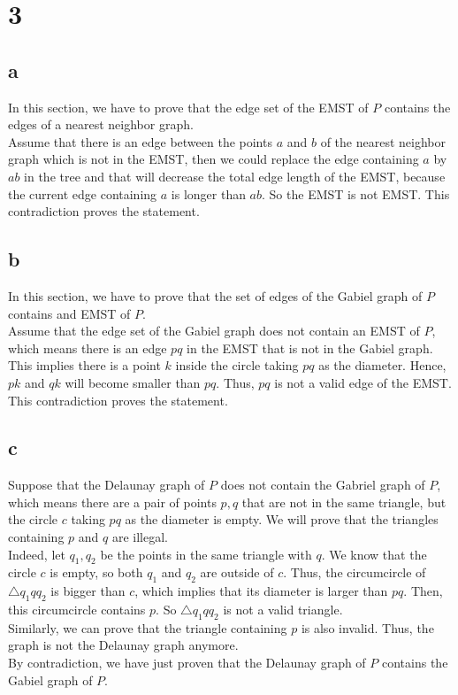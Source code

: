 \section*{3}
\subsection*{a}
In this section, we have to prove that the edge set of the EMST of $P$ contains the edges of a nearest neighbor graph.\\

Assume that there is an edge between the points $ a $ and $ b $ of the nearest neighbor graph which is not in the EMST, then we could replace the edge containing $a$ by $ab$ in the tree and that will decrease the total edge length of the EMST, because the current edge containing $a$ is longer than $ab$. So the EMST is not EMST. This contradiction proves the statement.

\subsection*{b}
In this section, we have to prove that the set of edges of the Gabiel graph of $P$ contains and EMST of $P$. \\

Assume that the edge set of the Gabiel graph does not contain an EMST of $P$, which means there is an edge $pq$ in the EMST that is not in the Gabiel graph. \\

This implies there is a point $k$ inside the circle taking $pq$ as the diameter. Hence,
$pk$ and $qk$ will become smaller than $pq$. Thus, $pq$ is not a valid edge of the EMST.
This contradiction proves the statement.

\subsection*{c}
Suppose that the Delaunay graph of $P$ does not contain the Gabriel graph of $P$, which means there are a pair of points ${p, q}$ that are not in the same triangle, but the circle $c$ taking $pq$ as the diameter is empty. We will prove that the triangles containing $p$ and $q$ are illegal. \\

Indeed, let $q_1, q_2$ be the points in the same triangle with $q$. We know that the circle $c$ is empty, so both $q_1$ and $q_2$ are outside of $c$. Thus, the 
circumcircle of $\bigtriangleup q_1 q q_2$ is bigger than $c$, which implies that its diameter is larger than $pq$. Then, this circumcircle contains $p$. So $\bigtriangleup q_1 q q_2$ is not a valid triangle. \\

Similarly, we can prove that the triangle containing $p$ is also invalid. Thus, the graph is not the Delaunay graph anymore. \\

By contradiction, we have just proven that the Delaunay graph of $P$ contains the Gabiel graph of $P$.
